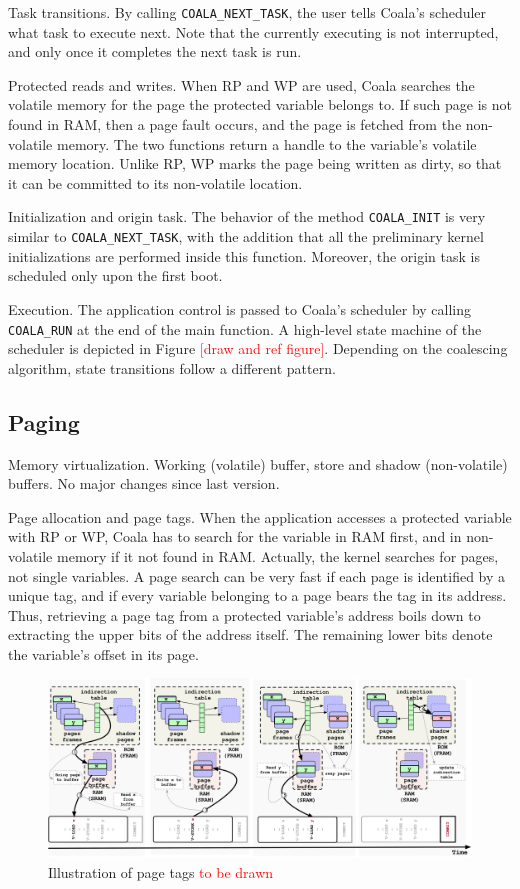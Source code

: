 Task transitions. By calling \texttt{COALA\_NEXT\_TASK}, the user tells Coala’s scheduler what task to execute next. Note that the currently executing is not interrupted, and only once it completes the next task is run.

Protected reads and writes. When RP and WP are used, Coala searches the volatile memory for the page the protected variable belongs to. If such page is not found in RAM, then a page fault occurs, and the page is fetched from the non-volatile memory. The two functions return a handle to the variable’s volatile memory location. Unlike RP, WP marks the page being written as dirty, so that it can be committed to its non-volatile location.

Initialization and origin task. The behavior of the method \texttt{COALA\_INIT} is very similar to \texttt{COALA\_NEXT\_TASK}, with the addition that all the preliminary kernel initializations are performed inside this function. Moreover, the origin task is scheduled only upon the first boot.

Execution. The application control is passed to Coala’s scheduler by calling \texttt{COALA\_RUN} at the end of the main function. A high-level state machine of the scheduler is depicted in Figure \textcolor{red}{[draw and ref figure]}. Depending on the coalescing algorithm, state transitions follow a different pattern.

\subsection{\sys Paging}

Memory virtualization. Working (volatile) buffer, store and shadow (non-volatile) buffers. No major changes since last version.

Page allocation and page tags. When the application accesses a protected variable with RP or WP, Coala has to search for the variable in RAM first, and in non-volatile memory if it not found in RAM. Actually, the kernel searches for pages, not single variables. A page search can be very fast if each page is identified by a unique tag, and if every variable belonging to a page bears the tag in its address. Thus, retrieving a page tag from a protected variable’s address boils down to extracting the upper bits of the address itself. The remaining lower bits denote the variable’s offset in its page.

\begin{figure}
	\includegraphics[width=\textwidth]{figures/graffle/paging.pdf}
	\caption{Illustration of page tags \textcolor{red}{to be drawn}}
\end{figure}

